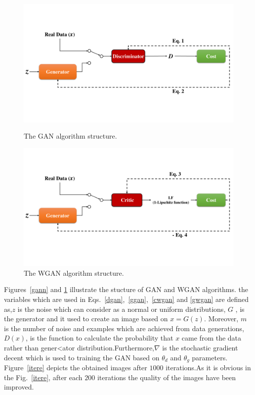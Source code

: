 \documentclass[conference]{IEEEtran}
\begin{document}
\begin{figure}
\centering
\includegraphics[width=1\columnwidth]{gan}
\caption{The GAN algorithm structure.}
\label{gann}
\centering
\includegraphics[width=1\columnwidth]{wgan}
\caption{The WGAN algorithm structure.}
\label{wgann}
\end{figure}

Figures~\ref{gann} and \ref{wgann} illustrate the stucture of GAN and WGAN algorithms.
the variables which are used in Eqs.~\ref{dgan},~\ref{ggan},~\ref{cwgan}	and \ref{gwgan} are defined as,$z$ is the noise which can consider as a normal or uniform distributions, $G$ , is the generator and it used to create an image based on $x=G(z)$. Moreover, $m$ is the number of noise and examples which are achieved from data generations, $D(x)$, is the function to calculate the probability that $x$ came from the data rather than gener<ator distribution.Furthermore,$\nabla$ is the stochastic gradient decent which is used to training the GAN based on $\theta_{d}$ and $\theta_{g}$ parameters.
Figure~\ref{itere} depicts the obtained images after $1000$ iterations.As it is obvious in the Fig.~\ref{itere}, after each $200$ iterations the quality of the images have been improved.
\end{document}
